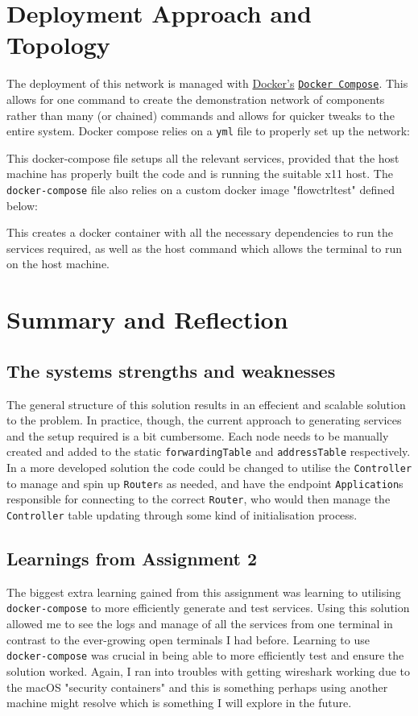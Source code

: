 \documentclass{article}
\newcommand{\code}[1]{\colorbox{light-gray}{\texttt{#1}}}
\begin{document}
    \newpage
    \section{Deployment Approach and Topology}
    \label{sec:Topology}
    The deployment of this network is managed with \hyperlink{https://docker.com}{Docker's} \hyperlink{https://docs.docker.com/compose/}{\code{Docker Compose}}. This allows for one command to create the demonstration network of components rather than many (or chained) commands and allows for quicker tweaks to the entire system. Docker compose relies on a \code{yml} file to properly set up the network:
    
    This docker-compose file setups all the relevant services, provided that the host machine has properly built the code and is running the suitable x11 host. The \code{docker-compose} file also relies on a custom docker image "flowctrltest" defined below:
    
    This creates a docker container with all the necessary dependencies to run the services required, as well as the host command which allows the terminal to run on the host machine. 
    
    \newpage
    \section{Summary and Reflection}
    \label{sec:summary}
    
    \subsection{The systems strengths and weaknesses}
    The general structure of this solution results in an effecient and scalable solution to the problem. In practice, though, the current approach to generating services and the setup required is a bit cumbersome. Each node needs to be manually created and added to the static \code{forwardingTable} and \code{addressTable} respectively. In a more developed solution the code could be changed to utilise the \code{Controller} to manage and spin up \code{Router}s as needed, and have the endpoint \code{Application}s responsible for connecting to the correct \code{Router}, who would then manage the \code{Controller} table updating through some kind of initialisation process.
    
    \subsection{Learnings from Assignment 2}
    The biggest extra learning gained from this assignment was learning to utilising \code{docker-compose} to more efficiently generate and test services. Using this solution allowed me to see the logs and manage of all the services from one terminal in contrast to the ever-growing open terminals I had before. Learning to use \code{docker-compose} was crucial in being able to more efficiently test and ensure the solution worked. Again, I ran into troubles with getting wireshark working due to the macOS "security containers" and this is something perhaps using another machine might resolve which is something I will explore in the future.
    
\end{document}
